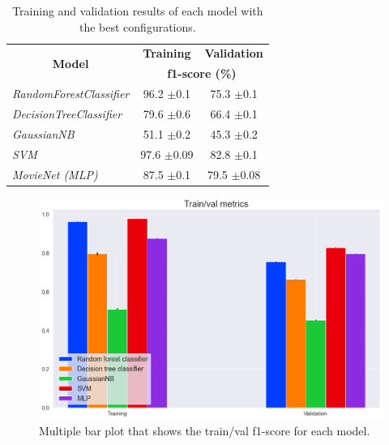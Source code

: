 \documentclass[../main]{subfiles}
\begin{document}
\begin{table}[!ht]
    \center
    \begin{tabular}{|l|cc|}
        \hline
        \multicolumn{1}{|c|}{\multirow{2}{*}{\textbf{Model}}} & \multicolumn{1}{c|}{\textbf{Training}} & \multicolumn{1}{l|}{\textbf{Validation}} \\
        \cline{2-3} 
        \multicolumn{1}{|c|}{}                                & \multicolumn{2}{c|}{\textbf{f1-score (\%)}}                                       \\
        \hline
        \textit{RandomForestClassifier}                       & \multicolumn{1}{c|}{96.2 $\pm$0.1}         & 75.3 $\pm$0.1                               \\
        \hline
        \textit{DecisionTreeClassifier}                       & \multicolumn{1}{c|}{79.6 $\pm$0.6}        & 66.4 $\pm$0.1                                \\
        \hline
        \textit{GaussianNB}                                   & \multicolumn{1}{c|}{51.1 $\pm$0.2}         & 45.3 $\pm$0.2                                \\
        \hline
        \textit{SVM}                                          & \multicolumn{1}{c|}{97.6 $\pm$0.09}       & 82.8 $\pm$0.1                               \\
        \hline
        \textit{MovieNet (MLP)}                               & \multicolumn{1}{c|}{87.5 $\pm$0.1}         & 79.5 $\pm$0.08                               \\
        \hline
    \end{tabular}
    \caption{Training and validation results of each model with the best configurations.}
    \label{table:train_val_results}
\end{table}

\begin{figure}[!ht]
    \center
    \includegraphics[width=0.8\linewidth]{figures/train_val_plot.png}
    \caption{Multiple bar plot that shows the train/val f1-score for each model.}
    \label{fig:train_val_plot}
\end{figure}
\newpage
\end{document}
